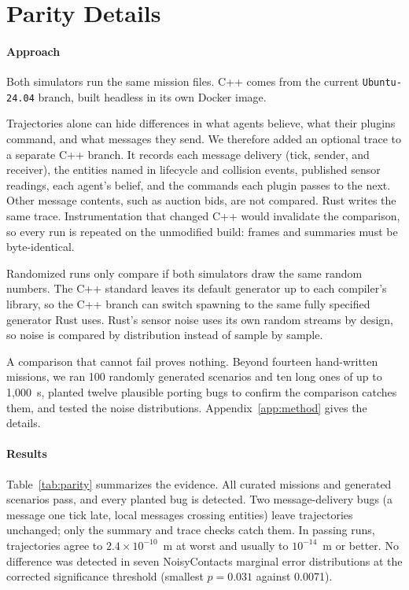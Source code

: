 \documentclass[conference]{IEEEtran}
\begin{document}
\appendices

\section{Parity Details}
\label{app:parity}

\paragraph{Approach}
Both simulators run the same mission files. C++ comes from the current
\texttt{Ubuntu-24.04} branch, built headless in its own Docker image.

Trajectories alone can hide differences in what agents believe, what their
plugins command, and what messages they send. We therefore added an optional
trace to a separate C++ branch. It records each message delivery (tick,
sender, and receiver), the entities named in lifecycle and collision events,
published sensor readings, each agent's belief, and the commands each plugin
passes to the next. Other message contents, such as auction bids, are not
compared. Rust writes the same trace. Instrumentation that changed C++ would
invalidate the
comparison, so every run is repeated on the unmodified build: frames and
summaries must be byte-identical.

Randomized runs only compare if both simulators draw the same random numbers.
The C++ standard leaves its default generator up to each compiler's library, so
the C++ branch can switch spawning to the same fully specified generator Rust
uses. Rust's sensor noise uses its own random streams by design, so noise is
compared by distribution instead of sample by sample.

A comparison that cannot fail proves nothing. Beyond fourteen hand-written
missions, we ran 100 randomly generated scenarios and ten long ones of up to
1{,}000~s, planted twelve plausible porting bugs to confirm the comparison
catches them, and tested the noise distributions. Appendix~\ref{app:method}
gives the details.

\paragraph{Results}
Table~\ref{tab:parity} summarizes the evidence. All curated missions and
generated scenarios pass, and every planted bug is detected. Two
message-delivery bugs (a message one tick late, local messages crossing
entities) leave trajectories unchanged; only the summary and trace checks catch
them. In passing runs, trajectories agree to $2.4\times10^{-10}$~m at worst and
usually to $10^{-14}$~m or better. No difference was detected in seven
NoisyContacts marginal error distributions at the corrected significance
threshold (smallest $p = 0.031$ against 0.0071).
\end{document}
